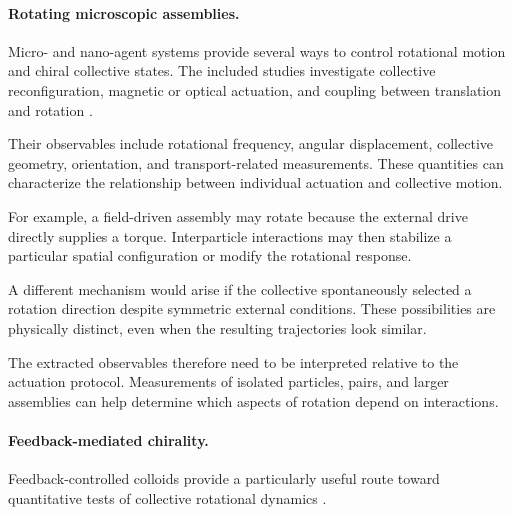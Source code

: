 \paragraph*{Rotating microscopic assemblies.}

Micro- and nano-agent systems provide
several ways to control rotational
motion and chiral collective states.
The included studies investigate
collective reconfiguration,
magnetic or optical actuation,
and coupling between translation
and rotation
\cite{Sun2021swarmingmicrodrople,MayorgaMartinez2023multimodaldrivenma,McGovern2024multifunctionalchir,Xu2023multiplecilialike,Gong2025collectivereconfigu,Chen2022programmablespatio,Aubret2021metamachinesofplur,Gao2025softmagneticmicror,Aubret2018targetedassemblyan,Raghavendra2026programmablepersist,Boudehane2026physicsbasedreduce,Wang2021precisecontrolofm,Dong2020controllingtwodime,Li2022vectorcontrolledwh}.

Their observables include
rotational frequency,
angular displacement,
collective geometry,
orientation, and
transport-related
measurements. These
quantities can characterize
the relationship between
individual actuation
and collective motion.

For example, a field-driven
assembly may rotate because
the external drive
directly supplies a torque.
Interparticle interactions
may then stabilize a
particular spatial
configuration or modify
the rotational response.

A different mechanism
would arise if the
collective spontaneously
selected a rotation
direction despite
symmetric external
conditions. These
possibilities are
physically distinct,
even when the resulting
trajectories look similar.

The extracted observables
therefore need to be
interpreted relative to
the actuation protocol.
Measurements of isolated
particles, pairs, and
larger assemblies can
help determine which
aspects of rotation
depend on interactions.

\paragraph*{Feedback-mediated chirality.}

Feedback-controlled colloids
provide a particularly useful
route toward quantitative
tests of collective rotational
dynamics
\cite{Martinet2022rotationcontrolin,Yan2014colloidalsuperstruc,Buerle2020formationofstable,Heuthe2025tunablecolloidalsw,Lffler2023collectiveforaging,Han2020programmablechiral,Chen2024persistentandrespo}.

